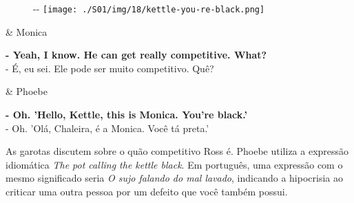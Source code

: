 \begin{figure}[!ht]
  \begin{adjustwidth}{-\oddsidemargin-1in}{-\rightmargin}
    \centering
    \texttt{[image: ./S01/img/18/kettle-you-re-black.png]}
  \end{adjustwidth}
\end{figure}

\begin{tcolorbox}[enhanced,center upper,
    drop fuzzy shadow southeast, boxrule=0.3pt,
    lower separated=false, breakable,
    colframe=black!30!dialogoBorder,colback=white]
\begin{minipage}[c]{0.16\linewidth}
   & \centering \scriptsize{Monica}
\end{minipage}
\hfill
\begin{minipage}[c]{0.8\linewidth}
  \textbf{- Yeah, I know. He can get really competitive. What?}\\
  - É, eu sei. Ele pode ser muito competitivo. Quê?
\end{minipage}

\medskip
\begin{minipage}[c]{0.16\linewidth}
   & \centering \scriptsize{Phoebe}
\end{minipage}
\hfill
\begin{minipage}[c]{0.8\linewidth}
  \textbf{- Oh. 'Hello, Kettle, this is Monica. You're black.'}\\
  - Oh. 'Olá, Chaleira, é a Monica. Você tá preta.'
\end{minipage}
\end{tcolorbox}

As garotas discutem sobre o quão competitivo Ross é. Phoebe utiliza a
expressão idiomática \emph{The pot calling the kettle black}. Em
português, uma expressão com o mesmo significado seria \emph{O sujo
falando do mal lavado}, indicando a hipocrisia ao criticar uma outra
pessoa por um defeito que você também possui.

